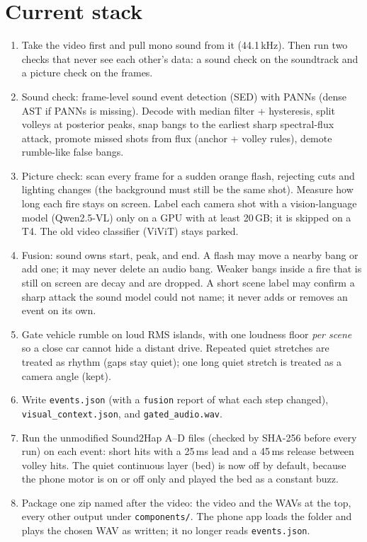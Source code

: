 \documentclass[11pt,a4paper]{article}
\begin{document}
\section{Current stack}
\begin{enumerate}[leftmargin=*,itemsep=2pt]
  \item Take the video first and pull mono sound from it (44.1\,kHz). Then run two checks that never see each other's data: a sound check on the soundtrack and a picture check on the frames.
  \item Sound check: frame-level sound event detection (SED) with PANNs (dense AST if PANNs is missing). Decode with median filter + hysteresis, split volleys at posterior peaks, snap bangs to the earliest sharp spectral-flux attack, promote missed shots from flux (anchor + volley rules), demote rumble-like false bangs.
  \item Picture check: scan every frame for a sudden orange flash, rejecting cuts and lighting changes (the background must still be the same shot). Measure how long each fire stays on screen. Label each camera shot with a vision-language model (Qwen2.5-VL) only on a GPU with at least 20\,GB; it is skipped on a T4. The old video classifier (ViViT) stays parked.
  \item Fusion: sound owns start, peak, and end. A flash may move a nearby bang or add one; it may never delete an audio bang. Weaker bangs inside a fire that is still on screen are decay and are dropped. A short scene label may confirm a sharp attack the sound model could not name; it never adds or removes an event on its own.
  \item Gate vehicle rumble on loud RMS islands, with one loudness floor \emph{per scene} so a close car cannot hide a distant drive. Repeated quiet stretches are treated as rhythm (gaps stay quiet); one long quiet stretch is treated as a camera angle (kept).
  \item Write \texttt{events.json} (with a \texttt{fusion} report of what each step changed), \texttt{visual\_context.json}, and \texttt{gated\_audio.wav}.
  \item Run the unmodified Sound2Hap A--D files (checked by SHA-256 before every run) on each event: short hits with a 25\,ms lead and a 45\,ms release between volley hits. The quiet continuous layer (bed) is now off by default, because the phone motor is on or off only and played the bed as a constant buzz.
  \item Package one zip named after the video: the video and the WAVs at the top, every other output under \texttt{components/}. The phone app loads the folder and plays the chosen WAV as written; it no longer reads \texttt{events.json}.
\end{enumerate}
\end{document}
